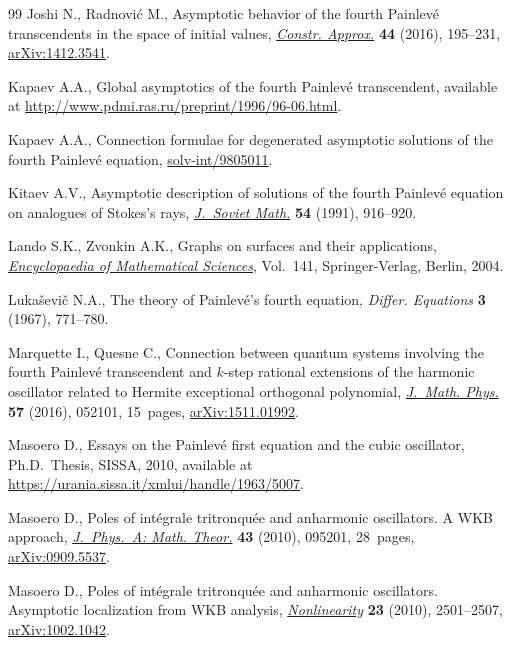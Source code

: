 \documentclass[pdftex]{sigma}
\numberwithin{equation}{section}
\begin{document}
\begin{thebibliography}{99}
Joshi N., Radnovi\'c M., Asymptotic behavior of the fourth {P}ainlev\'e
 transcendents in the space of initial values, \href{https://doi.org/10.1007/s00365-016-9329-3}{\textit{Constr. Approx.}}
 \textbf{44} (2016), 195--231, \href{https://arxiv.org/abs/1412.3541}{arXiv:1412.3541}.

Kapaev A.A., Global asymptotics of the fourth {P}ainlev\'e transcendent,
 available at \url{http://www.pdmi.ras.ru/preprint/1996/96-06.html}.

Kapaev A.A., Connection formulae for degenerated asymptotic solutions of the
 fourth {P}ainlev\'e equation, \href{https://arxiv.org/abs/solv-int/9805011}{solv-int/9805011}.

Kitaev A.V., Asymptotic description of solutions of the fourth {P}ainlev\'e
 equation on analogues of {S}tokes's rays, \href{https://doi.org/10.1007/BF01101121}{\textit{J.~Soviet Math.}}
 \textbf{54} (1991), 916--920.

Lando S.K., Zvonkin A.K., Graphs on surfaces and their applications,
 \href{https://doi.org/10.1007/978-3-540-38361-1}{\textit{Encyclopaedia of Mathematical Scien\-ces}}, Vol.~141, Springer-Verlag,
 Berlin, 2004.

Luka\v{s}evi\v{c} N.A., The theory of {P}ainlev\'e's fourth equation,
 \textit{Differ. Equations} \textbf{3} (1967), 771--780.

Marquette I., Quesne C., Connection between quantum systems involving the
 fourth {P}ainlev\'e transcendent and {$k$}-step rational extensions of the
 harmonic oscillator related to {H}ermite exceptional orthogonal polynomial,
 \href{https://doi.org/10.1063/1.4949470}{\textit{J.~Math. Phys.}} \textbf{57} (2016), 052101, 15~pages,
 \href{https://arxiv.org/abs/1511.01992}{arXiv:1511.01992}.

Masoero D., Essays on the {P}ainlev\'e f\/irst equation and the cubic oscillator,
 Ph.D.~Thesis, SISSA, 2010, available at \url{https://urania.sissa.it/xmlui/handle/1963/5007}.

Masoero D., Poles of int\'egrale tritronqu\'ee and anharmonic oscillators. {A}
 {WKB} approach, \href{https://doi.org/10.1088/1751-8113/43/9/095201}{\textit{J.~Phys.~A: Math. Theor.}} \textbf{43} (2010), 095201,
 28~pages, \href{https://arxiv.org/abs/0909.5537}{arXiv:0909.5537}.

Masoero D., Poles of int\'egrale tritronqu\'ee and anharmonic oscillators.
 {A}symptotic localization from {WKB} analysis, \href{https://doi.org/10.1088/0951-7715/23/10/008}{\textit{Nonlinearity}}
 \textbf{23} (2010), 2501--2507, \href{https://arxiv.org/abs/1002.1042}{arXiv:1002.1042}.


\end{thebibliography}
\end{document}
